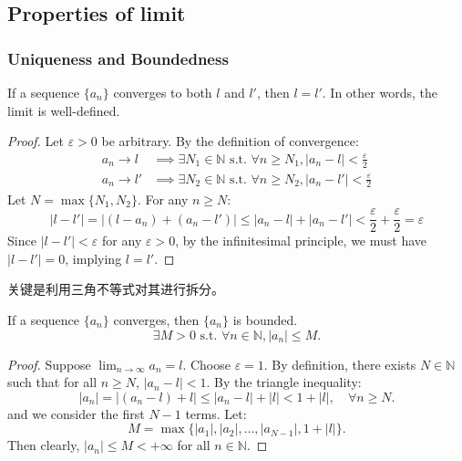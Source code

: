 \documentclass[
	UTF-8,
	11pt, %
	a4paper, %
]{LegrandOrangeBook}
\begin{document}
    \renewcommand{\to}{\rightarrow}
    \newcommand{\longto}{\longrightarrow}

    \subsection{Properties of limit}

    \subsubsection{Uniqueness and Boundedness}

    \begin{theorem}
    If a sequence $\{a_n\}$ converges to both $l$ and $l'$, then $l = l'$. In other words, the limit is well-defined.
    \end{theorem}

    \begin{proof}
    Let $\varepsilon > 0$ be arbitrary. By the definition of convergence:
    \begin{align*}
        a_n \to l &\implies \exists N_1 \in \mathbb{N} \text{ s.t. } \forall n \ge N_1, |a_n - l| < \frac{\varepsilon}{2} \\
        a_n \to l' &\implies \exists N_2 \in \mathbb{N} \text{ s.t. } \forall n \ge N_2, |a_n - l'| < \frac{\varepsilon}{2}
    \end{align*}
    Let $N = \max\{N_1, N_2\}$. For any $n \ge N$:
    \[ |l - l'| = |(l - a_n) + (a_n - l')| \le |a_n - l| + |a_n - l'| < \frac{\varepsilon}{2} + \frac{\varepsilon}{2} = \varepsilon \]
    Since $|l - l'| < \varepsilon$ for any $\varepsilon > 0$, by the infinitesimal principle, we must have $|l - l'| = 0$, implying $l = l'$.
    \end{proof}

    \begin{remark}
        关键是利用三角不等式对其进行拆分。
    \end{remark}

    \begin{theorem}
    If a sequence $\{a_n\}$ converges, then $\{a_n\}$ is bounded.
    \[ \exists M > 0 \text{ s.t. } \forall n \in \mathbb{N}, |a_n| \le M. \]
    \end{theorem}

    \begin{proof}
    Suppose $\lim_{n \to \infty} a_n = l$.
    Choose $\varepsilon = 1$. By definition, there exists $N \in \mathbb{N}$ such that for all $n \ge N$, $|a_n - l| < 1$.
    By the triangle inequality:
    \[ |a_n| = |(a_n - l) + l| \le |a_n - l| + |l| < 1 + |l|, \quad \forall n \ge N. \]
    and we consider the first $N-1$ terms. Let:
    \[ M = \max \{ |a_1|, |a_2|, \dots, |a_{N-1}|, 1 + |l| \}. \]
    Then clearly, $|a_n| \le M<+\infty$ for all $n \in \mathbb{N}$.
    \end{proof}
\end{document}

